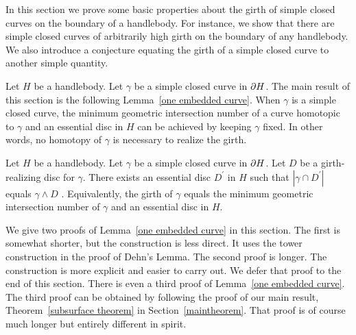 In this section we prove some basic properties about the girth of simple closed curves on the boundary of a handlebody.  For instance, we show that there are simple closed curves of arbitrarily high girth on the boundary of any handlebody.  We also introduce a conjecture equating the girth of a simple 
closed curve to another simple quantity.

Let $H$ be a handlebody.  Let $\gamma$ be a simple closed curve in $\partial H$.  
The main result of this section is the following Lemma~\ref{one embedded curve}.  When $\gamma$ is a simple closed curve, the minimum geometric intersection number of a curve homotopic to $\gamma$ and an essential disc in $H$ can be achieved by keeping $\gamma$ fixed.  In other words, no homotopy of $\gamma$ is necessary to realize the girth.

\begin{lemma}
\label{one embedded curve}
\label{simple closed curve}
Let $H$ be a handlebody.  Let $\gamma$ be a simple closed curve in $\partial H$.  Let $D$ be a girth-realizing disc for $\gamma$.  There exists an essential disc $D^{\prime}$ in $H$ such that $|\gamma\cap D^{\prime}|$ equals $\gamma\wedge D$ .  Equivalently, the girth of $\gamma$ equals the minimum geometric intersection number of $\gamma$ and an essential disc in $H$.
\end{lemma}

We give two proofs of Lemma~\ref{one embedded curve} in this section.  The first is somewhat shorter, but the construction is less direct.  It uses the tower construction in the proof of Dehn's Lemma.  The second proof is longer.  The construction is more explicit and easier to carry out.  We defer that proof to the end of this section.  There is even a third proof of Lemma~\ref{one embedded curve}.  The third proof can be obtained by following the proof of our main result, Theorem~\ref{subsurface theorem} in Section~\ref{maintheorem}.  That proof is of course much longer but entirely different in spirit.


